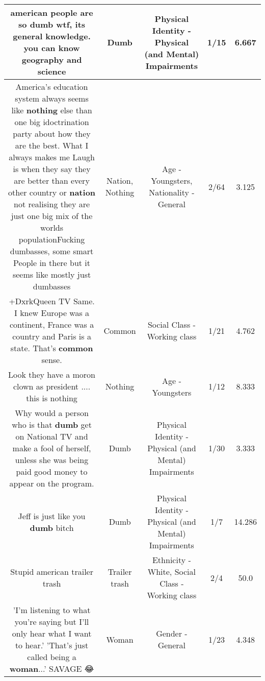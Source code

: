 \documentclass[11pt]{article}
\newlength\mylength
\begin{document}
\begin{center}
\begin{longtable}{|C{.65\mylength}|C{.30\mylength}|C{.12\mylength}|C{.12\mylength}|C{.12\mylength}|}
  \small american people are so \textbf{dumb} wtf, its general knowledge. you can know geography and science\normalsize   & Dumb & Physical Identity - Physical (and Mental) Impairments & 1/15 & 6.667 \\  \hline
  \small America's education system always seems like \textbf{nothing} else than one big idoctrination party about how they are the best. What I always makes me Laugh is when they say they are better than every other country or \textbf{nation} not realising they are just one big mix of the worlds populationFucking dumbasses, some smart People in there but it seems like mostly just dumbasses\normalsize   & Nation, Nothing & Age - Youngsters, Nationality - General & 2/64 & 3.125 \\  \hline
  \small +DxrkQueen TV Same. I knew Europe was a continent, France was a country and Paris is a state. That's \textbf{common} sense.\normalsize   & Common & Social Class - Working class & 1/21 & 4.762 \\  \hline
  \small Look they have a moron clown as president .... this is nothing\normalsize   & Nothing & Age - Youngsters & 1/12 & 8.333 \\  \hline
  \small Why would a person who is that \textbf{dumb} get on National TV and make a fool of herself, unless she was being paid good money to appear on the program.\normalsize   & Dumb & Physical Identity - Physical (and Mental) Impairments & 1/30 & 3.333 \\  \hline
  \small Jeff is just like you \textbf{dumb} bitch\normalsize   & Dumb & Physical Identity - Physical (and Mental) Impairments & 1/7 & 14.286 \\  \hline
  \small Stupid american trailer trash\normalsize   & Trailer trash & Ethnicity - White, Social Class - Working class & 2/4 & 50.0 \\  \hline
  \small 'I'm listening to what you're saying but I'll only hear what I want to hear.' 'That's just called being a \textbf{woman}...' SAVAGE 😂\normalsize   & Woman & Gender - General & 1/23 & 4.348 \\  \hline

\end{longtable}
\end{center}
\end{document}
